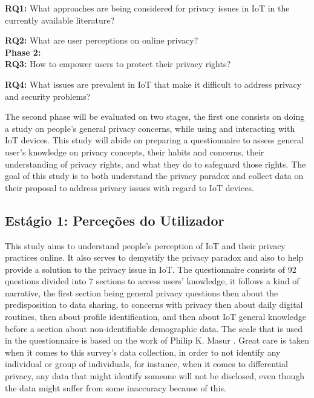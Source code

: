 \documentclass[conference]{IEEEtran}
\begin{document}
\textbf{RQ1:} What approaches are being considered for privacy issues in
IoT in the currently available literature?

\textbf{RQ2:} What are user perceptions on online privacy? \\

\textbf{Phase 2:} \\

\textbf{RQ3:}
How to empower users to protect their privacy rights?

\textbf{RQ4:} What issues are prevalent in IoT that make it difficult to
address privacy and security problems?
\vspace{5mm}

The second phase will be evaluated on two stages, the first one consists
on doing a study on people's general privacy concerns, while using and interacting
with IoT devices. This study will abide on preparing a questionnaire to
assess general user's knowledge on privacy concepts, their habits and concerns,
their understanding of privacy rights, and what they do to safeguard those
rights. The goal of this study is to both understand the privacy paradox
and collect data on their proposal to address privacy issues with regard
to IoT devices.

\subsection{Estágio 1: Perceções do Utilizador}

This study aims to understand people's perception of IoT and their privacy
practices online. It also serves to demystify the privacy paradox and also
to help provide a solution to the privacy issue in IoT. The questionnaire
consists of 92 questions divided into 7 sections to access users' knowledge,
it follows a kind of narrative, the first section being general privacy
questions then about the predisposition to data sharing, to concerns with
privacy then about daily digital routines, then about profile identification,
and then about IoT general knowledge before a section about non-identifiable
demographic data. The scale that is used in the questionnaire is based on
the work of Philip K. Masur \cite{masur2018situational}. Great care is taken
when it comes to this survey's data collection, in order to not identify
any individual or group of individuals, for instance, when it comes to differential
privacy, any data that might identify someone will not be disclosed, even
though the data might suffer from some inaccuracy because of this.
\end{document}
